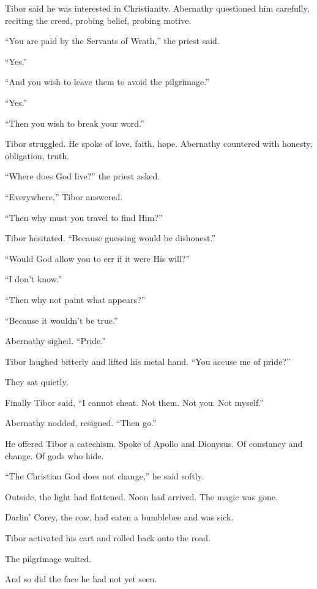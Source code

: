 Tibor said he was interested in Christianity. Abernathy questioned him carefully, reciting the creed, probing belief, probing motive.

“You are paid by the Servants of Wrath,” the priest said.

“Yes.”

“And you wish to leave them to avoid the pilgrimage.”

“Yes.”

“Then you wish to break your word.”

Tibor struggled. He spoke of love, faith, hope. Abernathy countered with honesty, obligation, truth.

“Where does God live?” the priest asked.

“Everywhere,” Tibor answered.

“Then why must you travel to find Him?”

Tibor hesitated. “Because guessing would be dishonest.”

“Would God allow you to err if it were His will?”

“I don’t know.”

“Then why not paint what appears?”

“Because it wouldn’t be true.”

Abernathy sighed. “Pride.”

Tibor laughed bitterly and lifted his metal hand. “You accuse me of pride?”

They sat quietly.

Finally Tibor said, “I cannot cheat. Not them. Not you. Not myself.”

Abernathy nodded, resigned. “Then go.”

He offered Tibor a catechism. Spoke of Apollo and Dionysus. Of constancy and change. Of gods who hide.

“The Christian God does not change,” he said softly.

Outside, the light had flattened. Noon had arrived. The magic was gone.

Darlin’ Corey, the cow, had eaten a bumblebee and was sick.

Tibor activated his cart and rolled back onto the road.

The pilgrimage waited.

And so did the face he had not yet seen.

